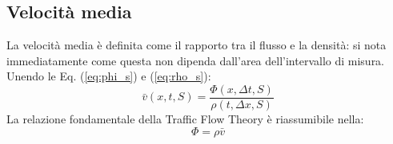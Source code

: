 \documentclass[../main.tex]{subfiles}
\begin{document}
\subsection{Velocit\`a media}
La velocit\`a media \`e definita come il rapporto tra il flusso e la densit\`a: si nota immediatamente come questa non dipenda dall'area dell'intervallo di misura.
Unendo le Eq. (\ref{eq:phi_s}) e (\ref{eq:rho_s}):
\begin{equation}
    \bar{v}(x, t, S)=\frac{\Phi(x, \Delta t, S)}{\rho(t,\Delta x, S)}
\end{equation}
La relazione fondamentale della Traffic Flow Theory \cite{H111} \`e riassumibile nella:
\begin{equation}
    \Phi=\rho\bar{v}
    \label{eq:fundamental}
\end{equation}
\end{document}
